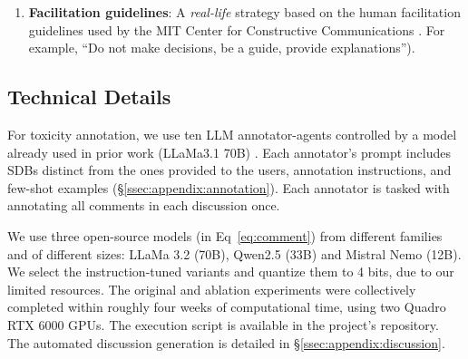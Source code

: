 \begin{enumerate}
    \item \textbf{Facilitation guidelines}: A \emph{real-life} strategy based on the human facilitation guidelines used by the MIT Center for Constructive Communications \cite{dimitra-book}. For example, “Do not make decisions, be a guide, provide explanations”). %
\end{enumerate}

\subsection{Technical Details}
\label{ssec:experimental:setup}

For toxicity annotation, we use ten \ac{LLM} annotator-agents controlled by a model already used in prior work (LLaMa3.1 70B) \cite{kang-qian-2024-implanting}. Each annotator's prompt includes \acp{SDB} distinct from the ones provided to the users, annotation instructions, and few-shot examples (\S\ref{ssec:appendix:annotation}). Each annotator is tasked with annotating all comments in each discussion once.

We use three open-source models (in Eq~\ref{eq:comment}) from different families and of different sizes: LLaMa 3.2 (70B), Qwen2.5 (33B) and Mistral Nemo (12B). We select the instruction-tuned variants and quantize them to 4 bits, due to our limited resources. The original and ablation experiments were collectively completed within roughly four weeks of computational time, using two Quadro RTX 6000 GPUs. The execution script is available in the project's repository\analysislink. The automated discussion generation is detailed in \S\ref{ssec:appendix:discussion}.